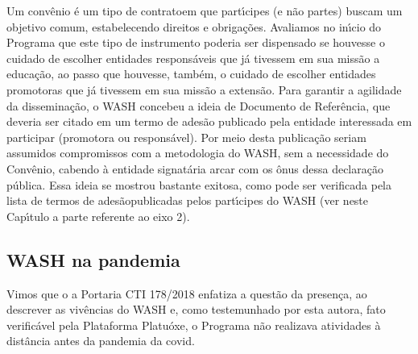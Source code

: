 \documentclass[
12pt,		%
openright,	%
twoside,  %
a4paper,			%
chapter=TITLE,		%
english,			%
french,				%
spanish,			%
brazil				%
]{USPSC-classe/USPSC}
\begin{document}
Um conv\^enio \'e um tipo de \textquotedbl contrato\textquotedbl  em que part\'{\i}cipes (e n\~ao partes) buscam um objetivo comum, estabelecendo direitos e obriga\c{c}\~oes. Avaliamos no in\'{\i}cio do Programa que este tipo de instrumento poderia ser dispensado se houvesse o cuidado de escolher entidades respons\'aveis que j\'a tivessem em sua miss\~ao a educa\c{c}\~ao, ao passo que houvesse, tamb\'em, o cuidado de escolher entidades promotoras que j\'a tivessem em sua miss\~ao a extens\~ao. Para garantir a agilidade da dissemina\c{c}\~ao, o WASH concebeu a ideia de \textquotedbl Documento de Refer\^encia\textquotedbl , que deveria ser citado em um termo de ades\~ao publicado pela entidade interessada em participar (promotora ou respons\'avel). Por meio desta publica\c{c}\~ao seriam assumidos compromissos com a metodologia do WASH, sem a necessidade do Conv\^enio, cabendo \`a entidade signat\'aria arcar com os \^onus dessa declara\c{c}\~ao p\'ublica. Essa ideia se mostrou bastante exitosa, como pode ser verificada pela lista de \textquotedbl termos de ades\~ao\textquotedbl  publicadas pelos part\'{\i}cipes do WASH (ver neste Cap\'{\i}tulo a parte referente ao eixo 2).

















\subsection[WASH na pandemia]{WASH na pandemia}\label{WASH na pandemia}
Vimos que o a Portaria CTI 178/2018 enfatiza a quest\~ao da \textquotedbl presen\c{c}a\textquotedbl , ao descrever as viv\^encias do WASH e, como testemunhado por esta autora, fato verific\'avel pela Plataforma Platu\'oxe, o Programa n\~ao realizava atividades \`a dist\^ancia antes da pandemia da covid.
\end{document}
